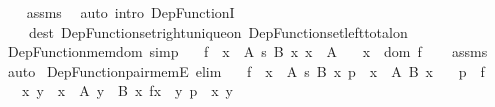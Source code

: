 \begin{isabellebody}
%
\isadelimproof
\ \ %
\endisadelimproof
%
\isatagproof
{}\isamarkupfalse%
\ assms\ \isamarkupfalse%
\ {\isacharparenleft}{\kern0pt}auto\ intro{\isacharbang}{\kern0pt}{\isacharcolon}{\kern0pt}\ Dep{\isacharunderscore}{\kern0pt}FunctionI\isanewline
\ \ \ \ dest{\isacharcolon}{\kern0pt}\ Dep{\isacharunderscore}{\kern0pt}Function{\isacharunderscore}{\kern0pt}set{\isacharunderscore}{\kern0pt}right{\isacharunderscore}{\kern0pt}unique{\isacharunderscore}{\kern0pt}on\ Dep{\isacharunderscore}{\kern0pt}Function{\isacharunderscore}{\kern0pt}set{\isacharunderscore}{\kern0pt}left{\isacharunderscore}{\kern0pt}total{\isacharunderscore}{\kern0pt}on{\isacharparenright}{\kern0pt}%
\endisatagproof
{\isafoldproof}%
%
\isadelimproof
\isanewline
%
\endisadelimproof
\isanewline
{}\isamarkupfalse%
\ Dep{\isacharunderscore}{\kern0pt}Function{\isacharunderscore}{\kern0pt}mem{\isacharunderscore}{\kern0pt}dom\ {\isacharbrackleft}{\kern0pt}simp{\isacharbrackright}{\kern0pt}{\isacharcolon}{\kern0pt}\isanewline
\ \ \ {\isachardoublequoteopen}f\ {\isacharcolon}{\kern0pt}\ {\isacharparenleft}{\kern0pt}x\ {\isacharcolon}{\kern0pt}\ A{\isacharparenright}{\kern0pt}\ {\isasymrightarrow}s\ B\ x{\isachardoublequoteclose}\ {\isachardoublequoteopen}x\ {\isacharcolon}{\kern0pt}\ A{\isachardoublequoteclose}\isanewline
\ \ \ {\isachardoublequoteopen}x\ {\isasymin}\ dom\ f{\isachardoublequoteclose}\isanewline
%
\isadelimproof
\ \ %
\endisadelimproof
%
\isatagproof
{}\isamarkupfalse%
\ assms\ \isamarkupfalse%
\ auto%
\endisatagproof
{\isafoldproof}%
%
\isadelimproof
\isanewline
%
\endisadelimproof
\isanewline
{}\isamarkupfalse%
\ Dep{\isacharunderscore}{\kern0pt}Function{\isacharunderscore}{\kern0pt}pair{\isacharunderscore}{\kern0pt}memE\ {\isacharbrackleft}{\kern0pt}elim{\isacharbrackright}{\kern0pt}{\isacharcolon}{\kern0pt}\isanewline
\ \ \ {\isachardoublequoteopen}f\ {\isacharcolon}{\kern0pt}\ {\isacharparenleft}{\kern0pt}x\ {\isacharcolon}{\kern0pt}\ A{\isacharparenright}{\kern0pt}\ {\isasymrightarrow}s\ B\ x{\isachardoublequoteclose}\ {\isachardoublequoteopen}p\ {\isacharcolon}{\kern0pt}\ {\isasymSum}x\ {\isacharcolon}{\kern0pt}\ A{\isachardot}{\kern0pt}\ {\isacharparenleft}{\kern0pt}B\ x{\isacharparenright}{\kern0pt}{\isachardoublequoteclose}\isanewline
\ \ \ {\isachardoublequoteopen}p\ {\isasymin}\ f{\isachardoublequoteclose}\isanewline
\ \ \ x\ y\ \ {\isachardoublequoteopen}x\ {\isacharcolon}{\kern0pt}\ A{\isachardoublequoteclose}\ {\isachardoublequoteopen}y\ {\isacharcolon}{\kern0pt}\ B\ x{\isachardoublequoteclose}\ {\isachardoublequoteopen}f{\isacharbackquote}{\kern0pt}x\ {\isacharequal}{\kern0pt}\ y{\isachardoublequoteclose}\ {\isachardoublequoteopen}p\ {\isacharequal}{\kern0pt}\ {\isasymlangle}x{\isacharcomma}{\kern0pt}\ y{\isasymrangle}{\isachardoublequoteclose}\isanewline

\end{isabellebody}
